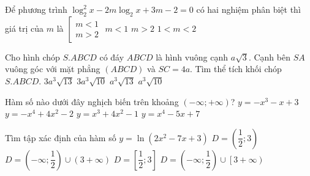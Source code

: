\begin{ex}%
	Để phương trình $\log_2^2x-2m\log_2x+3m-2=0$ có hai nghiệm phân biệt thì giá trị của $m$ là
	\choice
	{$\left[\begin{matrix} m<1\\m>2\end{matrix}\right.$}
	{$m<1$}
	{$m>2$}
	{\True $1<m<2$}
\end{ex}



\begin{ex}%
	Cho hình chóp $S.ABCD$ có đáy $ABCD$ là hình vuông cạnh $a\sqrt{3}$. Cạnh bên $SA$ vuông góc với mặt phẳng $(ABCD)$ và $SC=4a$. Tìm thể tích khối chóp $S.ABCD$.
	\choice
	{$3a^3\sqrt{13}$}
	{$3a^3\sqrt{10}$}
	{$a^3\sqrt{13}$}
	{\True $ a^3\sqrt{10}$}
\end{ex}




\begin{ex}%
	Hàm số nào dưới đây nghịch biến trên khoảng $(-\infty;+\infty)$?
	\choice
	{\True $y=-x^3-x+3$}
	{$y=-x^4+4x^2-2$}
	{$y=x^3+4x^2-1$}
	{$y=x^4-5x+7$}
\end{ex}




\begin{ex}%
	Tìm tập xác định của hàm số $y=\ln (2x^2-7x+3)$
	\choice
	{$D=\left(\dfrac{1}{2};3\right)$}
	{\True $D=\left(-\infty;\dfrac{1}{2}\right)\cup \left(3+\infty\right)$}
	{$D=\left[\dfrac{1}{2};3\right]$}
	{$D=\left(-\infty;\dfrac{1}{2}\right)\cup \left[3+\infty\right)$}
	
\end{ex}



